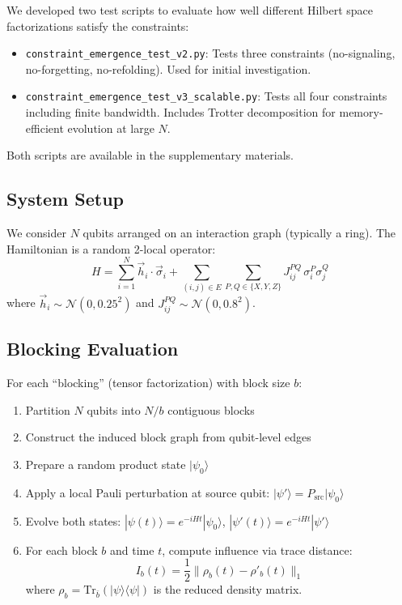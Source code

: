 \documentclass[11pt]{article}
\begin{document}
We developed two test scripts to evaluate how well different Hilbert space 
factorizations satisfy the constraints:

\begin{itemize}
    \item \texttt{constraint\_emergence\_test\_v2.py}: Tests three constraints 
    (no-signaling, no-forgetting, no-refolding). Used for initial investigation.
    
    \item \texttt{constraint\_emergence\_test\_v3\_scalable.py}: Tests all four 
    constraints including finite bandwidth. Includes Trotter decomposition for 
    memory-efficient evolution at large $N$.
\end{itemize}

Both scripts are available in the supplementary materials.

\subsection{System Setup}

We consider $N$ qubits arranged on an interaction graph (typically a ring). The 
Hamiltonian is a random 2-local operator:
\begin{equation}
    H = \sum_{i=1}^{N} \vec{h}_i \cdot \vec{\sigma}_i + \sum_{(i,j) \in E} \sum_{P,Q \in \{X,Y,Z\}} J_{ij}^{PQ} \, \sigma_i^P \sigma_j^Q
\end{equation}
where $\vec{h}_i \sim \mathcal{N}(0, 0.25^2)$ and $J_{ij}^{PQ} \sim \mathcal{N}(0, 0.8^2)$.

\subsection{Blocking Evaluation}

For each ``blocking'' (tensor factorization) with block size $b$:

\begin{enumerate}
    \item Partition $N$ qubits into $N/b$ contiguous blocks
    \item Construct the induced block graph from qubit-level edges
    \item Prepare a random product state $|\psi_0\rangle$
    \item Apply a local Pauli perturbation at source qubit: $|\psi'\rangle = P_{\text{src}} |\psi_0\rangle$
    \item Evolve both states: $|\psi(t)\rangle = e^{-iHt}|\psi_0\rangle$, $|\psi'(t)\rangle = e^{-iHt}|\psi'\rangle$
    \item For each block $b$ and time $t$, compute influence via trace distance:
    \begin{equation}
        I_b(t) = \frac{1}{2} \| \rho_b(t) - \rho'_b(t) \|_1
    \end{equation}
    where $\rho_b = \text{Tr}_{\bar{b}}(|\psi\rangle\langle\psi|)$ is the reduced density matrix.
\end{enumerate}
\end{document}
